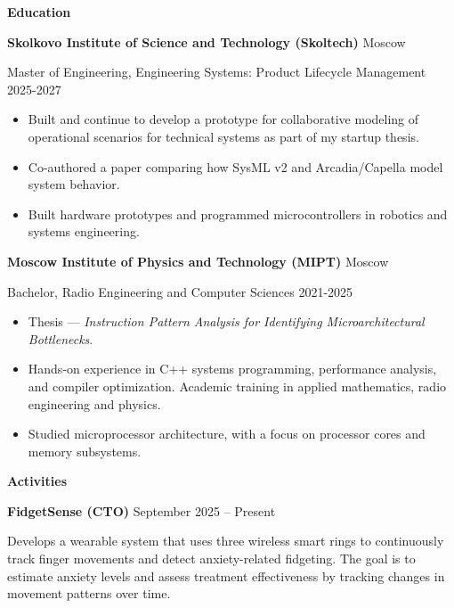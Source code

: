 \documentclass[11pt]{article}
\begin{document}
\vspace{12pt}

\begin{center}
  \textbf{Education}
\end{center}

\textbf{Skolkovo Institute of Science and Technology (Skoltech)} \hfill Moscow

Master of Engineering, Engineering Systems: Product Lifecycle Management \hfill 2025-2027
\begin{itemize}[noitemsep, topsep=0pt, partopsep=0pt, parsep=0pt]
  \item Built and continue to develop a prototype for collaborative modeling of operational scenarios
    for technical systems as part of my startup thesis.
  \item Co-authored a paper comparing how SysML v2 and Arcadia/Capella model system behavior.
  \item Built hardware prototypes and programmed microcontrollers in robotics and systems engineering.
\end{itemize}

\vspace{12pt}

\textbf{Moscow Institute of Physics and Technology (MIPT)} \hfill Moscow

Bachelor, Radio Engineering and Computer Sciences \hfill 2021-2025
\begin{itemize}[noitemsep, topsep=0pt, partopsep=0pt, parsep=0pt]
  \item Thesis --- \textit{Instruction Pattern Analysis for Identifying Microarchitectural Bottlenecks}.
  \item Hands-on experience in C++ systems programming, performance analysis, and compiler optimization.
    Academic training in applied mathematics, radio engineering and physics.
  \item Studied microprocessor architecture, with a focus on processor cores and memory subsystems.
\end{itemize}

\begin{center}
  \textbf{Activities}
\end{center}

\textbf{FidgetSense (CTO)} \hfill September 2025 – Present

Develops a wearable system that uses three wireless smart rings to continuously track
finger movements and detect anxiety-related fidgeting. The goal is to estimate anxiety levels and assess
treatment effectiveness by tracking changes in movement patterns over time.
\end{document}
